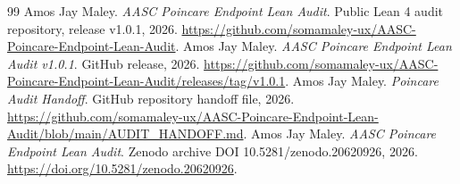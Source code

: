 \documentclass[11pt]{article}
\begin{document}
\begin{thebibliography}{99}
 Amos Jay Maley. \emph{AASC Poincare Endpoint Lean Audit}. Public Lean 4 audit repository, release v1.0.1, 2026. \url{https://github.com/somamaley-ux/AASC-Poincare-Endpoint-Lean-Audit}.
 Amos Jay Maley. \emph{AASC Poincare Endpoint Lean Audit v1.0.1}. GitHub release, 2026. \url{https://github.com/somamaley-ux/AASC-Poincare-Endpoint-Lean-Audit/releases/tag/v1.0.1}.
 Amos Jay Maley. \emph{Poincare Audit Handoff}. GitHub repository handoff file, 2026. \url{https://github.com/somamaley-ux/AASC-Poincare-Endpoint-Lean-Audit/blob/main/AUDIT_HANDOFF.md}.
 Amos Jay Maley. \emph{AASC Poincare Endpoint Lean Audit}. Zenodo archive DOI 10.5281/zenodo.20620926, 2026. \url{https://doi.org/10.5281/zenodo.20620926}.
\end{thebibliography}
\end{document}
